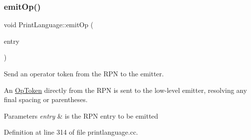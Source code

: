 \subsubsection{\texorpdfstring{emitOp()}{emitOp()}}
{\footnotesize\ttfamily void Print\+Language\+::emit\+Op (\begin{DoxyParamCaption}\item[{const \mbox{\hyperlink{struct_print_language_1_1_reverse_polish}{Reverse\+Polish}} \&}]{entry }\end{DoxyParamCaption})\hspace{0.3cm}{\ttfamily [protected]}}



Send an operator token from the R\+PN to the emitter. 

An \mbox{\hyperlink{class_op_token}{Op\+Token}} directly from the R\+PN is sent to the low-\/level emitter, resolving any final spacing or parentheses. 
\begin{DoxyParams}{Parameters}
{\em entry} & is the R\+PN entry to be emitted \\
\hline
\end{DoxyParams}


Definition at line 314 of file printlanguage.\+cc.

